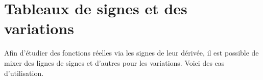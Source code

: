 \documentclass[10pt, a4paper]{article}
\begin{document}
\section{Tableaux de signes et des variations}

Afin d'étudier des fonctions réelles via les signes de leur dérivée, il est possible de mixer des lignes de signes et d'autres pour les variations. Voici des cas d'utilisation.
 
\end{document}
